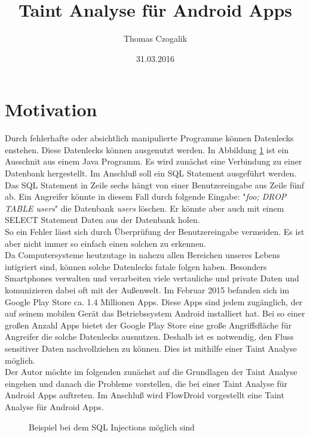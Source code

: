 \documentclass[runningheads]{llncs}
\begin{document}
\mainmatter
\title{Taint Analyse für Android Apps}
\author{Thomas Czogalik}
\date{31.03.2016}
\maketitle

\section{Motivation}
Durch fehlerhafte oder absichtlich manipulierte Programme können Datenlecks enstehen. Diese Datenlecks können ausgenutzt werden. 
In Abbildung \ref{fig:sql_code} ist ein Ausschnit aus einem Java Programm. Es wird zunächst eine Verbindung zu einer Datenbank hergestellt. Im Anschluß soll ein SQL Statement ausgeführt werden. Das SQL Statement in Zeile sechs hängt von einer Benutzereingabe aus Zeile fünf ab. Ein Angreifer könnte in diesem Fall durch folgende Eingabe: "\emph{foo; DROP TABLE users}" die Datenbank \emph{users} löschen. Er könnte aber auch mit einem SELECT Statement Daten aus der Datenbank holen. \\So ein Fehler lässt sich durch Überprüfung der Benutzereingabe vermeiden. Es ist aber nicht immer so einfach einen solchen zu erkennen. \\ Da Computersysteme heutzutage in nahezu allen Bereichen unseres Lebens intigriert sind, können solche Datenlecks fatale folgen haben. Besonders Smartphones verwalten und verarbeiten viele vertauliche und private Daten und komunizieren dabei oft mit der Außenwelt. Im Februar 2015 befanden sich im Google Play Store ca. 1.4 Millionen Apps. Diese Apps sind jedem zugänglich, der auf seinem mobilen Gerät das Betriebssystem Android installiert hat. Bei so einer großen Anzahl Apps bietet der Google Play Store eine große Angriffsfläche für Angreifer die solche Datenlecks ausnutzen. Deshalb ist es notwendig, den Fluss sensitiver Daten nachvollziehen zu können. Dies ist mithilfe einer Taint Analyse möglich.
\\Der Autor möchte im folgenden zunächst auf die Grundlagen der Taint Analyse eingehen und danach die Probleme vorstellen, die bei einer Taint Analyse für Android Apps auftreten. Im Anschluß wird FlowDroid vorgestellt eine Taint Analyse für Android Apps.

\begin{figure}

\caption{Beispiel bei dem SQL Injections möglich sind}
\label{fig:sql_code}
\end{figure}
\end{document}
